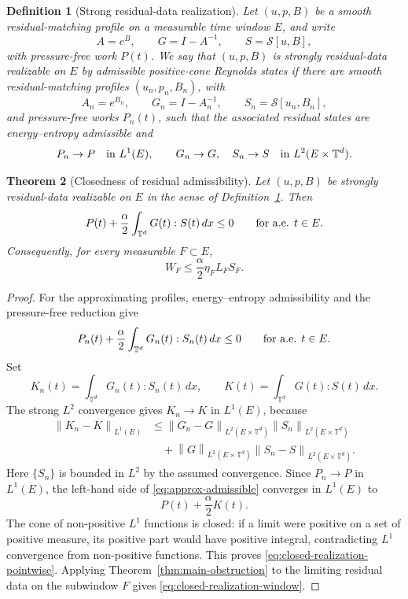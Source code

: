 \documentclass[11pt]{article}
\numberwithin{equation}{section}
\newtheorem{theorem}{Theorem}[section]
\newtheorem{definition}[theorem]{Definition}
\newcommand{\T}{\mathbb T}
\newcommand{\norm}[1]{\left\lVert #1\right\rVert}
\begin{document}
\begin{definition}[Strong residual-data realization]
\label{def:strong-residual-realization}
Let \((u,p,B)\) be a smooth residual-matching profile on a measurable time
window \(E\), and write
\[
  A=e^B,\qquad G=I-A^{-1},\qquad S=\mathcal S[u,B],
\]
with pressure-free work \(P(t)\).  We say that \((u,p,B)\) is strongly
residual-data realizable on \(E\) by admissible positive-cone Reynolds states if
there are smooth residual-matching profiles \((u_n,p_n,B_n)\), with
\[
  A_n=e^{B_n},\qquad G_n=I-A_n^{-1},\qquad S_n=\mathcal S[u_n,B_n],
\]
and pressure-free works \(P_n(t)\), such that the associated residual states are
energy--entropy admissible and
\[
  P_n\to P\quad\hbox{in }L^1(E),
  \qquad
  G_n\to G,\quad S_n\to S
  \quad\hbox{in }L^2(E\times\T^d).
\]
\end{definition}

\begin{theorem}[Closedness of residual admissibility]
\label{thm:closed-realization}
Let \((u,p,B)\) be strongly residual-data realizable on \(E\) in the sense of
Definition~\ref{def:strong-residual-realization}.  Then
\begin{equation}
  P(t)+\frac{\alpha}{2}\int_{\T^d}G(t):S(t)\,dx\le0
  \qquad\hbox{for a.e. }t\in E .
  \label{eq:closed-realization-pointwise}
\end{equation}
Consequently, for every measurable \(F\subset E\),
\begin{equation}
  W_F\le \frac{\alpha}{2}\eta_F L_FS_F .
  \label{eq:closed-realization-window}
\end{equation}
\end{theorem}

\begin{proof}
For the approximating profiles, energy--entropy admissibility and the
pressure-free reduction give
\begin{equation}
  P_n(t)+\frac{\alpha}{2}\int_{\T^d}G_n(t):S_n(t)\,dx\le0
  \qquad\hbox{for a.e. }t\in E .
  \label{eq:approx-admissible}
\end{equation}
Set
\[
  K_n(t)=\int_{\T^d}G_n(t):S_n(t)\,dx,\qquad
  K(t)=\int_{\T^d}G(t):S(t)\,dx .
\]
The strong \(L^2\) convergence gives \(K_n\to K\) in \(L^1(E)\), because
\[
\begin{aligned}
  \norm{K_n-K}_{L^1(E)}
  &\le
  \norm{G_n-G}_{L^2(E\times\T^d)}\norm{S_n}_{L^2(E\times\T^d)}\\
  &\quad
  +\norm{G}_{L^2(E\times\T^d)}
   \norm{S_n-S}_{L^2(E\times\T^d)} .
\end{aligned}
\]
Here \(\{S_n\}\) is bounded in \(L^2\) by the assumed convergence.  Since
\(P_n\to P\) in \(L^1(E)\), the left-hand side of
\eqref{eq:approx-admissible} converges in \(L^1(E)\) to
\[
  P(t)+\frac{\alpha}{2}K(t).
\]
The cone of non-positive \(L^1\) functions is closed: if a limit were positive
on a set of positive measure, its positive part would have positive integral,
contradicting \(L^1\) convergence from non-positive functions.  This proves
\eqref{eq:closed-realization-pointwise}.  Applying
Theorem~\ref{thm:main-obstruction} to the limiting residual data on the
subwindow \(F\) gives \eqref{eq:closed-realization-window}.
\end{proof}
\end{document}
